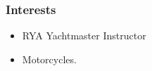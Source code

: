 \documentclass[a4paper, oneside, final, 11pt]{scrartcl} %
\begin{document}
\subsubsection*{Interests}
\begin{itemize}	
 \item RYA Yachtmaster Instructor
 \item Motorcycles. 
\end{itemize}






\end{document}
